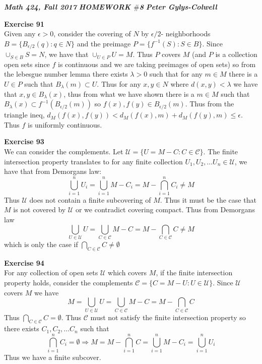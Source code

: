 \documentclass[12pt]{article}
\newenvironment{ques}[1]{\textbf{Exercise #1}\vspace{1 mm}\\ }{\bigskip}
\theoremstyle{definition}
\begin{document}
\noindent \textit{\textbf{Math 424, Fall 2017}} \hspace{1.3cm}
\textit{\textbf{HOMEWORK $\#$8}} \hspace{1.3cm} \textit{\textbf{Peter
Gylys-Colwell}} 

\vspace{1cm}

\begin{ques}{91}
	Given any $\epsilon > 0$, consider the covering of $N$ by $\epsilon/2$-
	neighborhoods $B = \{B_{\epsilon/2}(q): q \in N\}$ and the preimage $P =
	\{f^{-1}(S): S \in B\}$. Since $\cup_{S \in B} S = N$, we have that
	$\cup_{U \in P} U = M$. Thus $P$ covers $M$ (and $P$ is a collection open
	sets since $f$ is continuous and we are taking preimages of open sets) so
	from the lebesgue number lemma there exists $\lambda > 0$ such that for any
	$m \in M$ there is a $U \in P$ such that $B_\lambda(m) \subset U$. Thus for
	any $x,y \in N$ where $d(x,y) < \lambda$ we have that $x,y \in
	B_\lambda(x)$, thus from what we have shown there is a $m \in M$ such that
	$B_\lambda(x) \subset f^{-1}(B_{\epsilon / 2}(m))$ so $f(x), f(y) \in
	B_{\epsilon / 2}(m)$. Thus from the triangle ineq, $d_M(f(x),f(y)) <
	d_M(f(x),m) + d_M(f(y),m) \leq \epsilon$. Thus $f$ is uniformly continuous.
\end{ques}

\begin{ques}{93}
	We can consider the complements. Let $\mathcal U = \{U = M - C: C \in
	\mathcal C\}$. The finite intersection property translates to for any
	finite collection $U_1, U_2, \dots U_n \in \mathcal U$, we have that from
	Demorgans law:
	$$\bigcup_{i=1}^n U_i = \bigcup_{i=1}^n M - C_i = M - \bigcap_{i = 1}^n C_i \neq M$$
	Thus $\mathcal U$ does not contain a finite subcovering of $M$. Thus it
	must be the case that $M$ is not covered by $\mathcal U$ or we contradict
	covering compact. Thus from Demorgans law
	$$\bigcup_{U \in \mathcal U} U = \bigcup_{C \in \mathcal C} M - C = M -
	\bigcap_{C \in \mathcal C} C \neq M$$
	which is only the case if $\bigcap_{C \in \mathcal C} C \neq \emptyset$
\end{ques}

\begin{ques}{94}
	For any collection of open sets $\mathcal U$ which covers $M$, if the
	finite intersection property holds, consider the complements $\mathcal C =
	\{C = M - U: U \in \mathcal U\}$. Since $\mathcal U$ covers $M$ we have
	$$M = \bigcup_{U \in \mathcal U} U =  \bigcup_{C \in \mathcal C}M -  C = M
	- \bigcap_{C \in \mathcal C} C $$
	Thus $\bigcap_{C \in \mathcal C} C = \emptyset $. Thus $\mathcal C$ must
	not satisfy the finite intersection property so there exists $C_1, C_2,
	\dots C_n$ such that 
	$$\bigcap_{i=1}^n C_i = \emptyset \Rightarrow M = M - \bigcap_{i=1}^n C =
	\bigcup_{i=1}^n M - C_i = \bigcup_{i=1}^n U_i$$
	Thus we have a finite subcover.
\end{ques}
\end{document}

